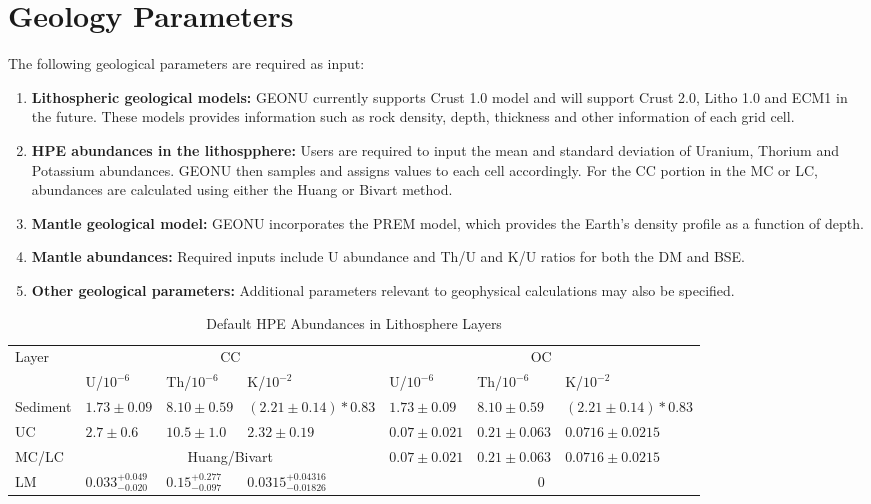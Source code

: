 		\section{Geology Parameters}
			The following geological parameters are required as input:
				\begin{enumerate}
					\item \textbf{Lithospheric geological models:} GEONU currently supports Crust 1.0 model and will support Crust 2.0, Litho 1.0 and ECM1 in the future. These models provides information such as rock density, depth, thickness and other information of each grid cell.
					\item \textbf{HPE abundances in the lithospphere:} Users are required to input the mean and standard deviation of Uranium, Thorium and Potassium abundances. GEONU then samples and assigns values to each cell accordingly. For the CC portion in the MC or LC, abundances are calculated using either the Huang or Bivart method.
					\item \textbf{Mantle geological model:} GEONU incorporates the PREM model, which provides the Earth's density profile as a function of depth.
					\item \textbf{Mantle abundances:} Required inputs include U abundance and Th/U and K/U ratios for both the DM and BSE.
					\item \textbf{Other geological parameters:} Additional parameters relevant to geophysical calculations may also be specified.
				\end{enumerate}
				\begin{table}[H]
					\centering
					\caption{Default HPE Abundances in Lithosphere Layers}
					\renewcommand{\arraystretch}{1.2} %
					\begin{tabular}{p{1.5cm}|p{2cm}p{2cm}p{3cm}|p{2cm}p{2cm}p{3cm}}
						\hline
						\hline
						\multirow{2}{*}{Layer} & \multicolumn{3}{c|}{CC} & \multicolumn{3}{c}{OC} \\  
						\cline{2-7}
						& U/$10^{-6}$ & Th/$10^{-6}$ & K/$10^{-2}$ & U/$10^{-6}$ & Th/$10^{-6}$ & K/$10^{-2}$\\
						\hline
						Sediment & $1.73\pm 0.09$ & $8.10\pm 0.59$ & $(2.21 \pm 0.14)* 0.83$ & $1.73 \pm 0.09$ & $8.10 \pm 0.59$ & $(2.21 \pm 0.14) * 0.83$\\
						\hline
						UC & $2.7 \pm 0.6$ & $10.5 \pm 1.0$ & $2.32 \pm 0.19$ & $0.07\pm 0.021$ & $0.21 \pm 0.063$ & $0.0716 \pm 0.0215$\\
						\hline
						MC/LC & \multicolumn{3}{c|}{Huang/Bivart} & $0.07 \pm 0.021$ & $0.21 \pm 0.063$ & $0.0716 \pm 0.0215$ \\
						\hline
						LM & $0.033^{+0.049}_{-0.020}$ & $0.15^{+0.277}_{-0.097}$ & $0.0315^{+0.04316}_{-0.01826}$ & \multicolumn{3}{c}{$0$} \\
						\hline
						\hline
					\end{tabular}
					\label{Table: Lithosphere Default Abundance Input}
				\end{table}
